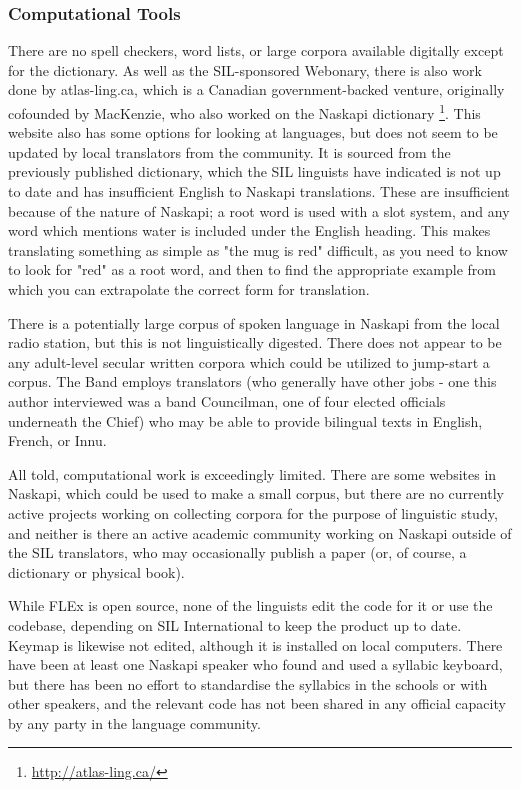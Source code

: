 \subsubsection{Computational Tools}
There are no spell checkers, word lists, or large corpora available digitally except for the dictionary. As well as the SIL-sponsored Webonary, there is also work done by atlas-ling.ca, which is a Canadian government-backed venture, originally cofounded by MacKenzie, who also worked on the Naskapi dictionary \footnote{\href{http://atlas-ling.ca/}{http://atlas-ling.ca/}}.
This website also has some options for looking at languages, but does not seem to be updated by local translators from the community. It is sourced from the previously published dictionary, which the SIL linguists have indicated is not up to date and has insufficient English to Naskapi translations. These are insufficient because of the nature of Naskapi; a root word is used with a slot system, and any word which mentions water is included under the English heading. This makes translating something as simple as "the mug is red" difficult, as you need to know to look for "red" as a root word, and then to find the appropriate example from which you can extrapolate the correct form for translation.

There is a potentially large corpus of spoken language in Naskapi from the local radio station, but this is not linguistically digested. There does not appear to be any adult-level secular written corpora which could be utilized to jump-start a corpus. The Band employs translators (who generally have other jobs - one this author interviewed was a band Councilman, one of four elected officials underneath the Chief) who may be able to provide bilingual texts in English, French, or Innu.

All told, computational work is exceedingly limited. There are some websites in Naskapi, which could be used to make a small corpus, but there are no currently active projects working on collecting corpora for the purpose of linguistic study, and neither is there an active academic community working on Naskapi outside of the SIL translators, who may occasionally publish a paper (or, of course, a dictionary or physical book).

While FLEx is open source, none of the linguists edit the code for it or use the codebase, depending on SIL International to keep the product up to date. Keymap is likewise not edited, although it is installed on local computers. There have been at least one Naskapi speaker who found and used a syllabic keyboard, but there has been no effort to standardise the syllabics in the schools or with other speakers, and the relevant code has not been shared in any official capacity by any party in the language community.
